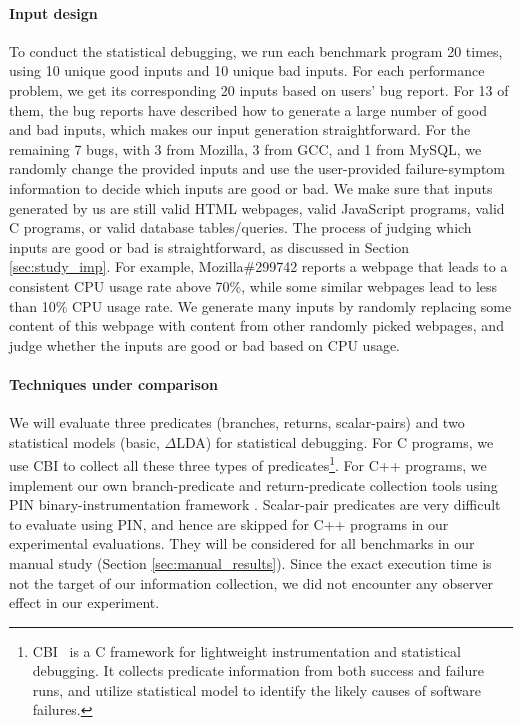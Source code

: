\paragraph{Input design}
To conduct the statistical debugging, we run each benchmark program 20 times, using
10 unique good inputs and 10 unique bad inputs.
For each performance problem, we get its corresponding 20 inputs based on users'
bug report. For 13 of them, the bug reports have described
how to generate a large number of good and bad inputs, which makes our input
generation straightforward. For the remaining 7 bugs, with 3 from Mozilla, 3 
from GCC, and 1 from MySQL, we randomly
change the provided inputs and use the user-provided failure-symptom
information to decide which inputs are good or bad.
We make sure that inputs generated by us are still valid HTML webpages, valid JavaScript programs,
valid C programs, or valid database tables/queries.
The process of judging which inputs
are good or bad is straightforward,
as discussed in Section \ref{sec:study_imp}.
For example, Mozilla\#299742 reports a webpage that leads to a consistent
CPU usage rate above 70\%, while some similar webpages lead to less than 10\% 
CPU usage rate. We generate many inputs by randomly replacing some content of this 
webpage with content from other randomly picked webpages, and judge whether
the inputs are good or bad based on CPU usage. 

\paragraph{Techniques under comparison}
We will evaluate three predicates (branches, returns, scalar-pairs)
and two statistical models (basic, $\Delta$LDA) for statistical debugging.
For C programs, we use CBI \cite{liblit03,liblit05} to collect all these
three types of predicates\footnote{
CBI~\cite{liblit03,liblit05} 
is a C framework for lightweight instrumentation and statistical debugging. 
It collects predicate information from both success and failure runs,
and utilize statistical 
model to identify the likely causes of software failures. 
}.
For C++ programs, we implement our own branch-predicate and
return-predicate collection tools using
PIN binary-instrumentation framework \cite{pin}.
Scalar-pair predicates are very difficult to evaluate using PIN, 
and hence are skipped for C++ programs in our experimental evaluations.
They will be considered for all benchmarks in our manual study 
(Section \ref{sec:manual_results}).
Since the exact execution time is not the target of our information collection,
we did not encounter any observer effect in our experiment.

